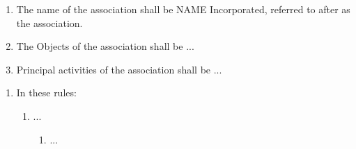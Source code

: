 


\begin{enumerate}
    \item The name of the association shall be NAME Incorporated, referred to after as the association.
    \item The Objects of the association shall be ...
    \item Principal activities of the association shall be ...
\end{enumerate}


\begin{enumerate}
    \item In these rules:
    \begin{enumerate}
        \item ...
        \begin{enumerate}
            \item ...
        \end{enumerate}
    \end{enumerate}    
\end{enumerate}